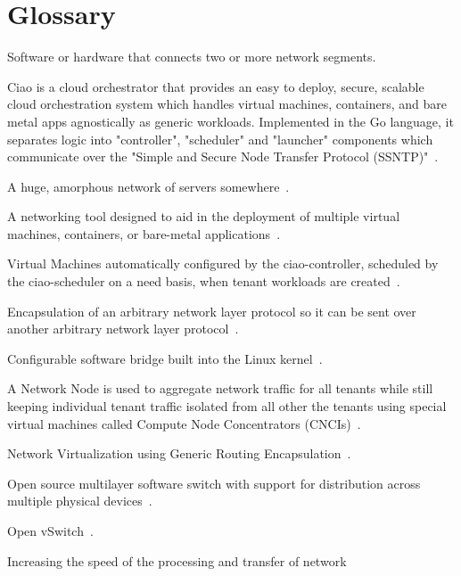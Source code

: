 \documentclass[10pt,letterpaper,onecolumn,journal]{IEEEtran}
\begin{document}
\section{Glossary}
\begin{description}[leftmargin=12em,style=nextline]
	\item[Bridge]
		Software or hardware that connects two or more network segments.
	\item[Ciao]
		Ciao is a cloud orchestrator that provides an easy to deploy,
		secure, scalable cloud orchestration system which handles
		virtual machines, containers, and bare metal apps agnostically
		as generic workloads. Implemented in the Go language, it
		separates logic into "controller", "scheduler" and "launcher"
		components which communicate over the "Simple and Secure Node
		Transfer Protocol (SSNTP)"~\cite{ciao}.
	\item[Cloud]
		A huge, amorphous network of servers somewhere~\cite{xkcd908}.
	\item[Cloud Orchestration]
		A networking tool designed to aid in the deployment of multiple
		virtual machines, containers, or bare-metal
		applications~\cite{ciao}.
	\item[CNCI]
		Virtual Machines automatically configured by the
		ciao-controller, scheduled by the ciao-scheduler on a need
		basis, when tenant workloads are created~\cite{ciaoNetworking}.
	\item[Generic Routing Encapsulation (GRE)]
		Encapsulation of an arbitrary network layer protocol so it can
		be sent over another arbitrary network layer
		protocol~\cite{rfc1701}.
	\item[Linux Bridge]
		Configurable software bridge built into the Linux
		kernel~\cite{linuxBridge}.
	\item[Network Node (NN)]
		A Network Node is used to aggregate network traffic for all
		tenants while still keeping individual tenant traffic isolated
		from all other the tenants using special virtual machines called
		Compute Node Concentrators (CNCIs)~\cite{ciaoNetworking}.
	\item[nvGRE]
		Network Virtualization using Generic Routing
		Encapsulation~\cite{rfc7637}.
	\item[Open vSwitch]
		Open source multilayer software switch with support for
		distribution across multiple physical devices~\cite{ovs}.
	\item[OVS]
		Open vSwitch~\cite{ovs}.
	\item[Packet Acceleration]
		Increasing the speed of the processing and transfer of network

\end{description}
\end{document}
